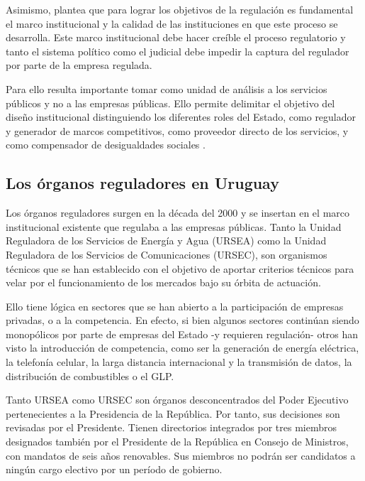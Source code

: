 \documentclass[
  12pt,
  spanish,
]{book}
\begin{document}
Asimismo, plantea que para lograr los objetivos de la regulación es
fundamental el marco institucional y la calidad de las instituciones en
que este proceso se desarrolla. Este marco institucional debe hacer
creíble el proceso regulatorio y tanto el sistema político como el
judicial debe impedir la captura del regulador por parte de la empresa
regulada.

Para ello resulta importante tomar como unidad de análisis a los
servicios públicos y no a las empresas públicas. Ello permite delimitar
el objetivo del diseño institucional distinguiendo los diferentes roles
del Estado, como regulador y generador de marcos competitivos, como
proveedor directo de los servicios, y como compensador de desigualdades
sociales \citep{Bergara2001}.

\hypertarget{los-uxf3rganos-reguladores-en-uruguay}{%
\subsection{Los órganos reguladores en
Uruguay}\label{los-uxf3rganos-reguladores-en-uruguay}}

Los órganos reguladores surgen en la década del 2000 y se insertan en el
marco institucional existente que regulaba a las empresas públicas.
Tanto la Unidad Reguladora de los Servicios de Energía y Agua (URSEA)
como la Unidad Reguladora de los Servicios de Comunicaciones (URSEC),
son organismos técnicos que se han establecido con el objetivo de
aportar criterios técnicos para velar por el funcionamiento de los
mercados bajo su órbita de actuación.

Ello tiene lógica en sectores que se han abierto a la participación de
empresas privadas, o a la competencia. En efecto, si bien algunos
sectores continúan siendo monopólicos por parte de empresas del Estado
-y requieren regulación- otros han visto la introducción de competencia,
como ser la generación de energía eléctrica, la telefonía celular, la
larga distancia internacional y la transmisión de datos, la distribución
de combustibles o el GLP.

Tanto URSEA como URSEC son órganos desconcentrados del Poder Ejecutivo
pertenecientes a la Presidencia de la República. Por tanto, sus
decisiones son revisadas por el Presidente. Tienen directorios
integrados por tres miembros designados también por el Presidente de la
República en Consejo de Ministros, con mandatos de seis años renovables.
Sus miembros no podrán ser candidatos a ningún cargo electivo por un
período de gobierno.
\end{document}
